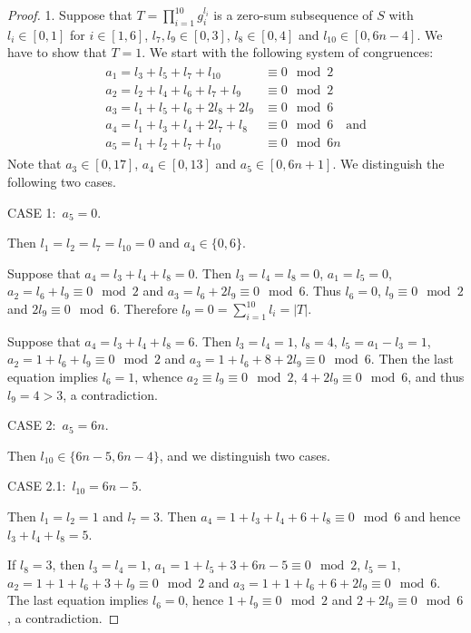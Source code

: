 \documentclass[10pt,a4paper]{amsart}
\begin{document}
\begin{proof}
1. Suppose that  $T = \prod_{i=1}^{10} g_i^{l_i}$ is a zero-sum
subsequence of $S$ with $l_i \in [0,1]$ for $i \in [1,6]$, $l_7, l_9
\in [0,3]$, $l_8 \in [0,4]$ and $l_{10} \in [0, 6n-4]$. We have to
show that $T = 1$. We start with the following system of
congruences:
\begin{align*}
\begin{aligned}
a_1 = l_3+l_5+l_7+l_{10} & \equiv 0 \mod 2 \\
a_2 = l_2+l_4+l_6+l_7+l_9 & \equiv 0 \mod 2 \\
a_3 = l_1+l_5+l_6+ 2l_8 + 2l_9 & \equiv 0 \mod 6 \\
a_4 = l_1+l_3+l_4+2l_7+l_8 & \equiv 0 \mod 6  \quad \text{and} \\
a_5 = l_1+l_2+l_7+l_{10} & \equiv 0 \mod 6n
\end{aligned}
\end{align*}
Note that $a_3 \in [0, 17]$, $a_4 \in [0, 13]$ and $a_5 \in [0,
6n+1]$. We distinguish the following two cases.


\smallskip
\noindent CASE 1: \,$a_5 = 0$.

Then $l_1=l_2=l_7=l_{10} = 0$ and $a_4 \in \{0, 6\}$.

Suppose that $a_4 = l_3+l_4+l_8=0$. Then $l_3=l_4=l_8=0$,
$a_1=l_5=0$, $a_2 = l_6+l_9 \equiv 0 \mod 2$ and $a_3 = l_6 + 2l_9
\equiv 0 \mod 6$. Thus $l_6 = 0$, $l_9 \equiv 0 \mod 2$ and $2 l_9
\equiv 0 \mod 6$. Therefore $l_9 = 0 = \sum_{i=1}^{10} l_i = |T|$.

Suppose that $a_4 = l_3+l_4+l_8=6$. Then $l_3=l_4=1$, $l_8 = 4$,
$l_5 = a_1-l_3=1$, $a_2 = 1 + l_6 + l_9 \equiv 0 \mod 2$ and $a_3 =
1 + l_6 + 8 + 2l_9 \equiv 0 \mod 6$. Then the last equation implies
 $l_6 = 1$, whence $a_2 \equiv l_9 \equiv 0 \mod 2$,  $4 + 2 l_9
\equiv 0 \mod 6$, and thus $l_9=4>3$, a contradiction.

\smallskip
\noindent CASE 2: \,$a_5 = 6n$.

Then $l_{10} \in \{6n-5, 6n-4\}$, and we distinguish two cases.

\smallskip
\noindent CASE 2.1: \,$l_{10} = 6n-5$.

Then $l_1=l_2=1$ and $l_7 = 3$. Then $a_4=1+l_3+l_4+6+l_8 \equiv 0
\mod 6$ and hence $l_3+l_4+l_8=5$.

If $l_8=3$, then $l_3=l_4=1$, $a_1=1+l_5+3+6n-5 \equiv 0 \mod 2$,
$l_5=1$, $a_2=1+1+l_6+3+l_9 \equiv 0 \mod 2$ and $a_3=1+1+l_6+6+2l_9
\equiv 0 \mod 6$. The last equation implies $l_6=0$, hence $1+l_9
\equiv 0 \mod 2$ and $2+2l_9 \equiv 0 \mod 6$, a contradiction.


\end{proof}
\end{document}
